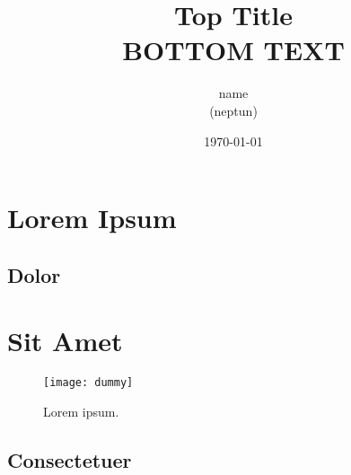 

\title{Top Title \\ \small{BOTTOM TEXT}}
\author{name \\ \small{(neptun)}}
\date{\today}





\myTitlePage

\section{Lorem Ipsum}
\lipsum[1-2]
\subsection{Dolor}
\lipsum[2-3]
\section{Sit Amet}
\lipsum[1-2]

\begin{figure}[htb]
	\texttt{[image: dummy]}
	\centering
	\caption{Lorem ipsum.}
	\label{fig:dummy}
\end{figure}

\subsection{Consectetuer}
\lipsum[2-3]

\myTOC
